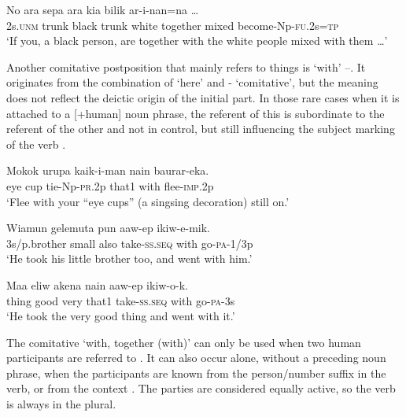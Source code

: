\ea%
\label{ex:3:x1819}
\gll No ara sepa ara kia  bilik ar-i-nan=na {\dots}\\
2s.\textsc{unm} trunk black trunk white together mixed become-Np-\textsc{fu}.2s=\textsc{tp}\\
\glt`If you, a black person, are together with the white people mixed with them {\dots}'
\z

Another comitative postposition that mainly refers to things is  `with' --. It originates from the combination of  `here' and - `comitative', but the meaning does not reflect the deictic origin of the initial part. In those rare cases when it is attached to a [+human] noun phrase, the referent of this  is subordinate to the referent of the other  and not in control, but still influencing the subject marking of the verb . 

\ea%
\label{ex:3:x824}
\gll Mokok urupa kaik-i-man nain  baurar-eka. \\
eye cup tie-Np-\textsc{pr}.2p that1 with flee-\textsc{imp}.2p\\
\glt`Flee with your ``eye cups'' (a singsing decoration) still on.'
\z

\ea%
\label{ex:3:x825}
\gll Wiamun gelemuta pun aaw-ep  ikiw-e-mik. \\
3s/p.brother small also take-\textsc{ss}.\textsc{seq} with go-\textsc{pa}-1/3p\\
\glt`He took his little brother too, and went with him.'
\z

\ea%
\label{ex:3:x1818}
\gll Maa eliw akena nain aaw-ep  ikiw-o-k. \\
thing good very that1 take-\textsc{ss}.\textsc{seq} with go-\textsc{pa}-3s\\
\glt`He took the very good thing and went with it.'
\z

The  comitative  `with, together (with)' can only be used when two human participants are referred to . It can also occur alone, without a preceding noun phrase, when the participants are known from the person/number suffix in the verb, or from the context . The parties are considered equally active, so the verb is always in the plural.

